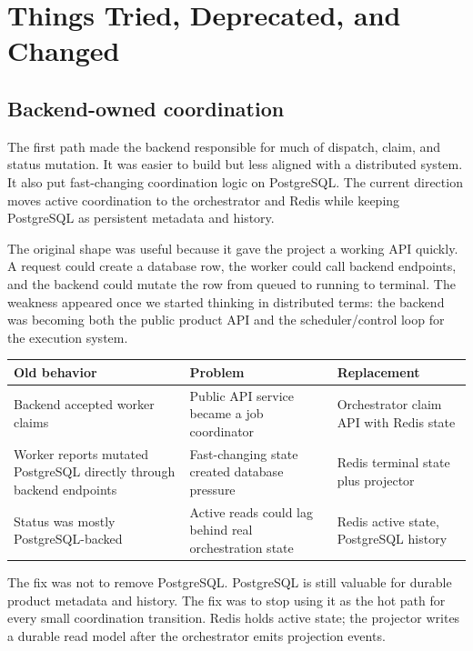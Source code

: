 \documentclass[12pt,a4paper]{report}
\begin{document}
\clearpage

\chapter{Things Tried, Deprecated, and Changed}

\section{Backend-owned coordination}

The first path made the backend responsible for much of dispatch, claim, and
status mutation. It was easier to build but less aligned with a distributed
system. It also put fast-changing coordination logic on PostgreSQL. The current
direction moves active coordination to the orchestrator and Redis while keeping
PostgreSQL as persistent metadata and history.

The original shape was useful because it gave the project a working API
quickly. A request could create a database row, the worker could call backend
endpoints, and the backend could mutate the row from queued to running to
terminal. The weakness appeared once we started thinking in distributed terms:
the backend was becoming both the public product API and the scheduler/control
loop for the execution system.

\begin{longtable}{p{}p{}p{}}
\toprule
\textbf{Old behavior} & \textbf{Problem} & \textbf{Replacement} \\
\midrule
Backend accepted worker claims & Public API service became a job coordinator & Orchestrator claim API with Redis state \\
Worker reports mutated PostgreSQL directly through backend endpoints & Fast-changing state created database pressure & Redis terminal state plus projector \\
Status was mostly PostgreSQL-backed & Active reads could lag behind real orchestration state & Redis active state, PostgreSQL history \\
\bottomrule
\end{longtable}

The fix was not to remove PostgreSQL. PostgreSQL is still valuable for durable
product metadata and history. The fix was to stop using it as the hot path for
every small coordination transition. Redis holds active state; the projector
writes a durable read model after the orchestrator emits projection events.
\end{document}
